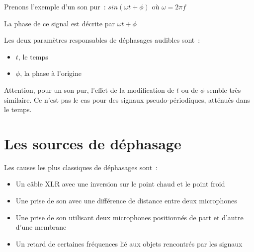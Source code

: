 \documentclass[
]{book}
\providecommand{\tightlist}{%
  \setlength{\itemsep}{0pt}\setlength{\parskip}{0pt}}
\begin{document}
Prenons l'exemple d'un son pur~:
\(sin (\omega t + \phi)\) où \(\omega = 2\pi f\)

La phase de ce signal est décrite par \(\omega t +\phi\)

Les deux paramètres responsables de déphasages audibles sont~:

\begin{itemize}
\tightlist
\item
  \(t\), le temps
\item
  \(\phi\), la phase à l'origine
\end{itemize}

Attention, pour un son pur, l'effet de la modification de \(t\) ou de \(\phi\) semble très similaire. Ce n'est pas le cas pour des signaux pseudo-périodiques, atténués dans le temps.

\hypertarget{les-sources-de-duxe9phasage}{%
\section{Les sources de déphasage}\label{les-sources-de-duxe9phasage}}

Les causes les plus classiques de déphasages sont~:

\begin{itemize}
\tightlist
\item
  Un câble XLR avec une inversion sur le point chaud et le point froid
\item
  Une prise de son avec une différence de distance entre deux microphones
\item
  Une prise de son utilisant deux microphones positionnés de part et d'autre d'une membrane
\item
  Un retard de certaines fréquences lié aux objets rencontrés par les signaux
\end{itemize}
\end{document}
